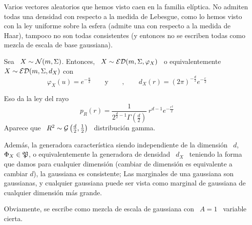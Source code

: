 Varios  vectores aleatorios que  hemos visto  caen en  la familia  el\'iptica.  No
admiten todas  una densidad con respecto a  la medida de Lebesgue,  como lo hemos
visto con la ley uniforme sobre la esfera (admite una con respecto a la medida de
Haar), tampoco no  son todas consistentes (y entonces no  se escriben todas como
mezcla de escala de base gaussiana).
%
\begin{ejemplo}
%
  Sea \ $X \sim \mathcal{N}(m,\Sigma)$.  Entonces, \ $X \sim \mathcal{ED}(m,\Sigma,\varphi_X)$ \ o
  equivalentemente \ $X \sim \mathcal{ED}(m,\Sigma,d_X)$ con
  \[
  \varphi_X(u) =  e^{-\frac{u}{2}} \qquad \mbox{y}  \qquad , \qquad d_X(r)  = (2
  \pi)^{-\frac{d}{2}} e^{- \frac{r}{2}}
  \]
  
  Eso da la ley del rayo
  \[
  p_R(r)  =  \frac{1}{2^{\frac{d}{2}-1}  \Gamma\left(  \frac{d}{2}  \right)}  \:
  r^{d-1} e^{- \frac{r^2}{2}}
  \]
  Aparece   que  \   $R^2  \sim   \mathcal{G}\left(  \frac{d}{2}   ,   \frac12\right)$  \
  distribuci\'on gamma.
  
  Adem\'as,   la  generadora   caracter\'istica  siendo   independiente   de  la
  dimensi\'on \  $d$, \  $\Phi_X \in \mathfrak{P}$,  o equivalentemente la  generadora de
  densidad  \ $d_X$ \  teniendo la  forma que  damos para  cualquier dimensi\'on
  (cambiar  de  dimensi\'on es  equivalente  a  cambiar  $d$), la  gaussiana  es
  consistente;  Las marginales  de  una gaussiana  son  gaussianas, y  cualquier
  gaussiana puede ser vista como  marginal de gaussiana de cualquier dimensi\'on
  m\'as grande.

  Obviamente, se  escribe como  mezcla de  escala de gaussiana  con \  $A =  1$ \
  variable cierta.
\end{ejemplo}

